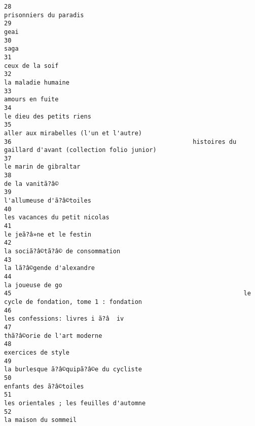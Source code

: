\documentclass[
]{report}
\begin{document}
\begin{verbatim}
28                                                                                   prisonniers du paradis
29                                                                                                     geai
30                                                                                                     saga
31                                                                                          ceux de la soif
32                                                                                       la maladie humaine
33                                                                                          amours en fuite
34                                                                                 le dieu des petits riens
35                                                                   aller aux mirabelles (l'un et l'autre)
36                                                  histoires du gaillard d'avant (collection folio junior)
37                                                                                    le marin de gibraltar
38                                                                                          de la vanitã?â©
39                                                                                 l'allumeuse d'ã?â©toiles
40                                                                            les vacances du petit nicolas
41                                                                                 le jeã?â»ne et le festin
42                                                                         la sociã?â©tã?â© de consommation
43                                                                                la lã?â©gende d'alexandre
44                                                                                         la joueuse de go
45                                                                le cycle de fondation, tome 1 : fondation
46                                                                        les confessions: livres i ã?â  iv
47                                                                              thã?â©orie de l'art moderne
48                                                                                       exercices de style
49                                                                   la burlesque ã?â©quipã?â©e du cycliste
50                                                                                   enfants des ã?â©toiles
51                                                                  les orientales ; les feuilles d'automne
52                                                                                     la maison du sommeil

\end{verbatim}
\end{document}

